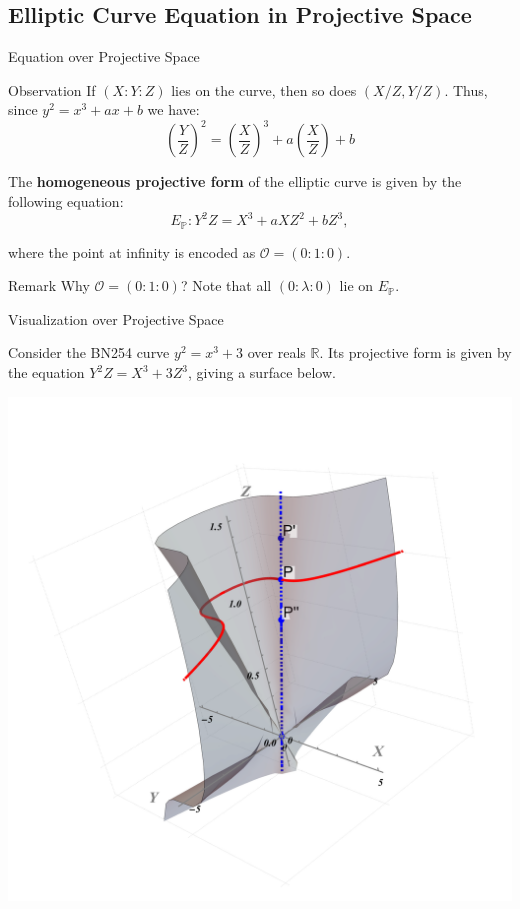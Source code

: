 \documentclass{zkdl-presentation-template}
\begin{document}
    \subsection{Elliptic Curve Equation in Projective Space}
    \begin{frame}{Equation over Projective Space}
        \begin{block}{Observation}
            If $(X:Y:Z)$ lies on the curve, then so does $(X/Z,Y/Z)$.  Thus, since $y^2=x^3+ax+b$ we have:
            \begin{equation*}
                \left(\frac{Y}{Z}\right)^2 = \left(\frac{X}{Z}\right)^3 + a\left(\frac{X}{Z}\right) + b
            \end{equation*}
        \end{block}

        \begin{definition}
            The \textbf{homogeneous projective form} of the elliptic curve is given by the following equation:
            \vspace{-5pt}
            \begin{equation*}
                E_{\mathbb{P}}: Y^2Z = X^3 + aXZ^2 + bZ^3,
            \end{equation*}
            \vspace{-20pt}
            
            where the point at infinity is encoded as $\mathcal{O} = (0:1:0)$.
        \end{definition}

        \begin{block}{Remark}
            Why $\mathcal{O} = (0:1:0)$? Note that all $(0:\lambda:0)$ lie on $E_{\mathbb{P}}$.
        \end{block}
    \end{frame}

    \begin{frame}{Visualization over Projective Space}
        \begin{example}
            Consider the BN254 curve $y^2 = x^3 + 3$ over reals $\mathbb{R}$. Its projective form is given by the equation $Y^2Z = X^3 + 3Z^3$, giving a surface below.
            \begin{center}
                \includegraphics[trim={275 100 225 100}, width=0.3\linewidth, clip]{images/lecture_4/projective_ec.pdf}        
            \end{center}
        \end{example}
    \end{frame}
\end{document}

